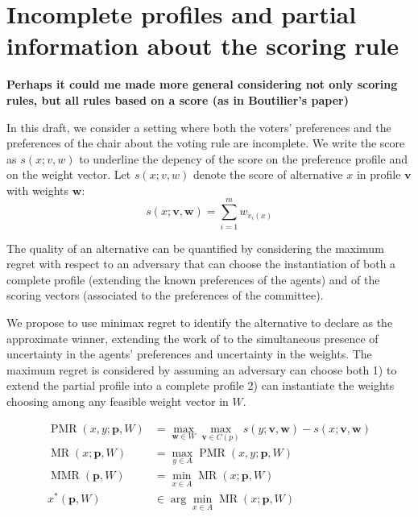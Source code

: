 \documentclass[12pt]{article}
\newcommand{\rank}{v}
\newcommand{\profile}{\textbf{v}}%
\newcommand{\pprofile}{\textbf{p}}%
\newcommand{\w}{\textbf{w}}%
\DeclareMathOperator{\PMR}{PMR}
\DeclareMathOperator{\MR}{MR}
\DeclareMathOperator{\MMR}{MMR}
\begin{document}
\section*{Incomplete profiles and partial information about the scoring rule}

{\bf Perhaps it could me made more general considering not only scoring rules, but all rules based on a score (as in Boutilier's paper)}

In this draft, we consider a setting where both the voters' preferences and the preferences of the chair about the voting rule are incomplete.
We write the score as $s(x; v,w)$ to underline the depency of the score on the preference profile and on the weight vector. Let $s(x;v,w)$ denote the score of alternative $x$ in profile $\textbf{v}$ with weights $\textbf{w}$:
\[ s(x;\textbf{v},\textbf{w}) = \sum_{i=1}^{m} w_{\rank_i(x)} \]


The quality of an alternative can be quantified by considering the maximum regret with respect to an adversary that can choose the instantiation of both a complete profile (extending the known preferences of the agents) and of the scoring vectors (associated to the preferences of the committee).


We propose to use minimax regret to identify the alternative to declare as the approximate winner, extending the work of \cite{Lu2011} to the simultaneous presence of uncertainty in the agents' preferences and uncertainty in the weights.
The maximum regret is considered by assuming an adversary can choose both 1) to extend the partial profile into a complete profile 2) can instantiate the weights choosing among any feasible weight vector in $W$.


\begin{align*}
\PMR(x,y; \pprofile, W) &= \max_{\w \in W} \max_{\profile \in C(p)} s(y; \profile,\w) - s(x; \profile,\w)\\
\MR(x; \pprofile, W) &= \max_{y \in A} \PMR(x,y; \pprofile, W) \\
\MMR(\pprofile,W) & = \min_{x \in A} \MR(x;\pprofile,W) \\
x^{*}(\pprofile,W) & \in \arg\min_{x \in A} \MR(x;\pprofile,W) 
\end{align*}
\end{document}
